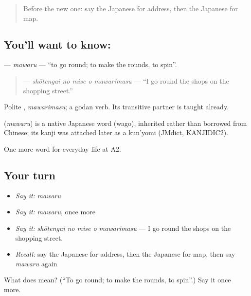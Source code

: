 \label{lesson:JA-C196-mawaru}



\begin{quote}
Before the new one: say the Japanese for address, then the Japanese for map.
\end{quote}

\subsection*{You'll want to know: }
\textbf{} — \emph{mawaru} — \textquotedblleft{}to go round; to make the rounds, to spin\textquotedblright{}.

\begin{quote}
\textbf{  } — \emph{shōtengai no mise o mawarimasu} — \textquotedblleft{}I go round the shops on the shopping street.\textquotedblright{}
\end{quote}

Polite \textbf{}, \emph{mawarimasu}; a godan verb. Its transitive partner \textbf{} is taught already.

\begin{cousinweb}
\textbf{} (\emph{mawaru}) is a native Japanese word (wago), inherited rather than borrowed from Chinese; its kanji was attached later as a kun'yomi (JMdict, KANJIDIC2).
\end{cousinweb}

\begin{grammarlens}[title={What you've built}]
One more word for everyday life at A2.
\end{grammarlens}

\subsection*{Your turn}
\begin{itemize}
\raggedright
  \item \emph{Say it:} \emph{mawaru}
  \item \emph{Say it:} \emph{mawaru}, once more
  \item \emph{Say it:} \emph{shōtengai no mise o mawarimasu} — I go round the shops on the shopping street.
  \item \emph{Recall:} say the Japanese for address, then the Japanese for map, then say \emph{mawaru} again
\end{itemize}

\begin{tcolorbox}[breakable,colback=teal!4,colframe=teal!35!black,title={Before you move on}]
What does  mean? (\textquotedblleft{}To go round; to make the rounds, to spin\textquotedblright{}.) Say it once more.
\end{tcolorbox}
